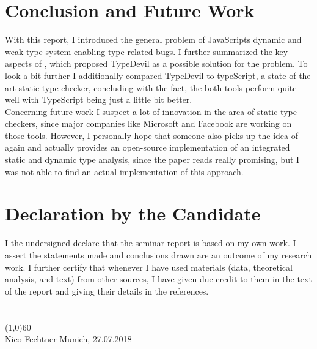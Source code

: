 \documentclass[runningheads,a4paper]{llncs}
\begin{document}
\newpage
\section{Conclusion and Future Work}
With this report, I introduced the general problem of JavaScripts dynamic and weak type system enabling type related bugs.
I further summarized the key aspects of \cite{DBLP:conf/icse/PradelSS15}, which proposed TypeDevil as a possible solution for the problem.
To look a bit further I additionally compared TypeDevil to typeScript, a state of the art static type checker, concluding with the fact, the both tools perform quite well with TypeScript being just a little bit better.\\
Concerning future work I suspect a lot of innovation in the area of static type checkers, since major companies like Microsoft and Facebook are working on those tools.
However, I personally hope that someone also picks up the idea of \cite{DBLP:conf/icse/TanXCLYS17} again and actually provides an open-source implementation of an integrated static and dynamic type analysis, since the paper reads really promising, but I was not able to find an actual implementation of this approach.  


\lstlistoflistings %
\listoffigures %

\newpage

{}


\newpage

\section*{Declaration by the Candidate}
I the undersigned declare that the seminar report is based on my own work.
I assert the statements made and conclusions drawn are an outcome of my research work. I further certify that whenever I have used materials (data, theoretical analysis, and text) from other sources, I have given due credit to them in the text of the report and giving their details in the references.
\\ \\ \\
\line(1,0){60}\\
Nico Fechtner
\hfill
Munich, 27.07.2018
\end{document}
